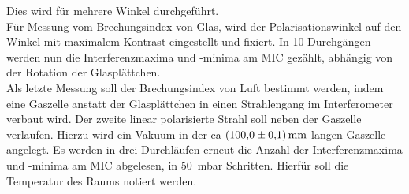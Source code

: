 Dies wird für mehrere Winkel durchgeführt.\\
Für Messung vom Brechungsindex von Glas, wird der Polarisationswinkel auf den Winkel mit maximalem Kontrast eingestellt und fixiert.
In 10 Durchgängen werden nun die Interferenzmaxima und -minima am MIC gezählt, abhängig von der Rotation der Glasplättchen.\\
Als letzte Messung soll der Brechungsindex von Luft bestimmt werden, indem eine Gaszelle anstatt der Glasplättchen in einen Strahlengang im Interferometer verbaut wird.
Der zweite linear polarisierte Strahl soll neben der Gaszelle verlaufen.
Hierzu wird ein Vakuum in der ca $\SI{100.0\pm0.1}{\milli\metre}$ langen Gaszelle angelegt.
Es werden in drei Durchläufen erneut die Anzahl der Interferenzmaxima und -minima am MIC abgelesen, in \SI{50}{\milli\bar} Schritten.
Hierfür soll die Temperatur des Raums notiert werden.